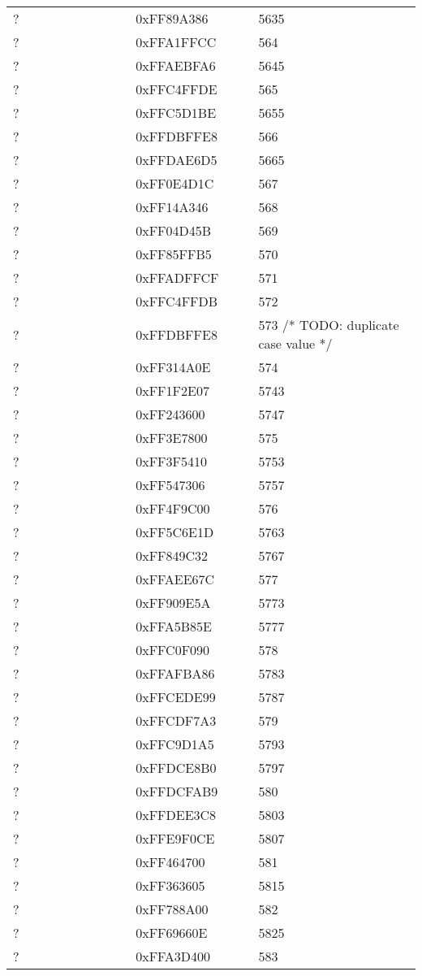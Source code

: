 \begin{longtable}{p{0.3\linewidth} p{0.3\linewidth} p{0.4\linewidth}}
? &  0xFF89A386 &  5635\\
? &  0xFFA1FFCC &  564\\
? &  0xFFAEBFA6 &  5645\\
? &  0xFFC4FFDE &  565\\
? &  0xFFC5D1BE &  5655\\
? &  0xFFDBFFE8 &  566\\
? &  0xFFDAE6D5 &  5665\\
? &  0xFF0E4D1C &  567\\
? &  0xFF14A346 &  568\\
? &  0xFF04D45B &  569\\
? &  0xFF85FFB5 &  570\\
? &  0xFFADFFCF &  571\\
? &  0xFFC4FFDB &  572\\
? &  0xFFDBFFE8 &  573 /* TODO: duplicate case value */\\
? &  0xFF314A0E &  574\\
? &  0xFF1F2E07 &  5743\\
? &  0xFF243600 &  5747\\
? &  0xFF3E7800 &  575\\
? &  0xFF3F5410 &  5753\\
? &  0xFF547306 &  5757\\
? &  0xFF4F9C00 &  576\\
? &  0xFF5C6E1D &  5763\\
? &  0xFF849C32 &  5767\\
? &  0xFFAEE67C &  577\\
? &  0xFF909E5A &  5773\\
? &  0xFFA5B85E &  5777\\
? &  0xFFC0F090 &  578\\
? &  0xFFAFBA86 &  5783\\
? &  0xFFCEDE99 &  5787\\
? &  0xFFCDF7A3 &  579\\
? &  0xFFC9D1A5 &  5793\\
? &  0xFFDCE8B0 &  5797\\
? &  0xFFDCFAB9 &  580\\
? &  0xFFDEE3C8 &  5803\\
? &  0xFFE9F0CE &  5807\\
? &  0xFF464700 &  581\\
? &  0xFF363605 &  5815\\
? &  0xFF788A00 &  582\\
? &  0xFF69660E &  5825\\
? &  0xFFA3D400 &  583\\

\end{longtable}

